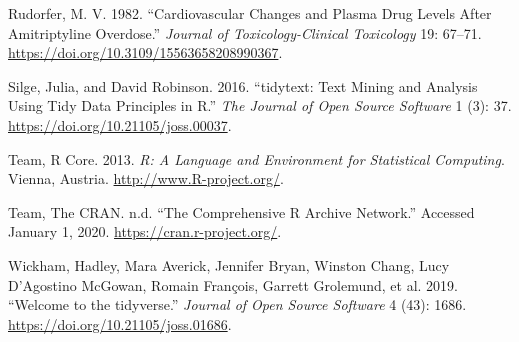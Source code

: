 \begin{CSLReferences}{1}{0}
\leavevmode{}%
Rudorfer, M. V. 1982. {``Cardiovascular Changes and Plasma Drug Levels After Amitriptyline Overdose.''} \emph{Journal of Toxicology-Clinical Toxicology} 19: 67--71. \url{https://doi.org/10.3109/15563658208990367}.

\leavevmode{}%
Silge, Julia, and David Robinson. 2016. {``{tidytext: Text Mining and Analysis Using Tidy Data Principles in R}.''} \emph{The Journal of Open Source Software} 1 (3): 37. \url{https://doi.org/10.21105/joss.00037}.

\leavevmode{}%
Team, R Core. 2013. \emph{{R: A Language and Environment for Statistical Computing}}. Vienna, Austria. \url{http://www.R-project.org/}.

\leavevmode{}%
Team, The CRAN. n.d. {``{The Comprehensive R Archive Network}.''} Accessed January 1, 2020. \url{https://cran.r-project.org/}.

\leavevmode{}%
Wickham, Hadley, Mara Averick, Jennifer Bryan, Winston Chang, Lucy D'Agostino McGowan, Romain François, Garrett Grolemund, et al. 2019. {``{Welcome to the tidyverse}.''} \emph{Journal of Open Source Software} 4 (43): 1686. \url{https://doi.org/10.21105/joss.01686}.

\end{CSLReferences}



\address{%
Tommy Jones\\
Foundation\\%
\\
%
%
%
%
}

\address{%
Mark J. Meyer\\
Georgetown University\\%
\\
%
%
%
%
}
